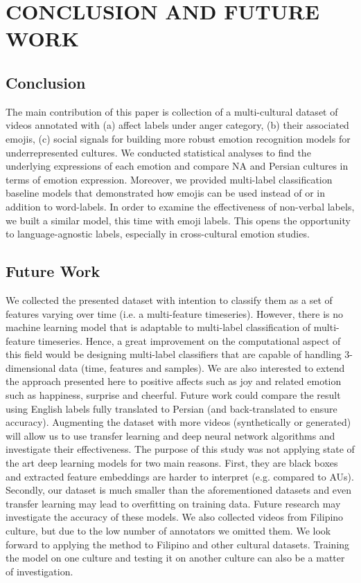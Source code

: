 \documentclass[letterpaper, 10 pt, conference]{ieeeconf}  \usepackage{FG2021}
\begin{document}
\section{CONCLUSION AND FUTURE WORK}

\subsection{Conclusion}
The main contribution of this paper is collection of a multi-cultural dataset of videos annotated with (a) affect labels under anger category, (b) their associated emojis, (c) social signals for building more robust emotion recognition models for underrepresented cultures. We conducted statistical analyses to find the underlying expressions of each emotion and compare NA and Persian cultures in terms of emotion expression. Moreover, we provided multi-label classification baseline models that demonstrated how emojis can be used instead of or in addition to word-labels. In order to examine the effectiveness of non-verbal labels, we built a similar model, this time with emoji labels. This opens the opportunity to language-agnostic labels, especially in cross-cultural emotion studies.



\subsection{Future Work}
We collected the presented dataset with intention to classify them as a set of features varying over time (i.e. a multi-feature timeseries). However, there is no machine learning model that is adaptable to multi-label classification of multi-feature timeseries. Hence, a great improvement on the computational aspect of this field would be designing multi-label classifiers that are capable of handling 3-dimensional data (time, features and samples). We are also interested to extend the approach presented here to positive affects such as joy and related emotion such as happiness, surprise and cheerful.
Future work could compare the result using English labels fully translated to Persian (and back-translated to ensure accuracy).
Augmenting the dataset with more videos (synthetically or generated) will allow us to use transfer learning and deep neural network algorithms and investigate their effectiveness.
The purpose of this study was not applying state of the art deep learning models for two main reasons. First, they are black boxes and extracted feature embeddings are harder to interpret (e.g. compared to AUs). Secondly, our dataset is much smaller than the aforementioned datasets and even transfer learning may lead to overfitting on training data. Future research may investigate the accuracy of these models.
We also collected videos from Filipino culture, but due to the low number of annotators we omitted them. We look forward to applying the method to Filipino and other cultural datasets. Training the model on one culture and testing it on another culture can also be a matter of investigation.




{\small


}
\end{document}
